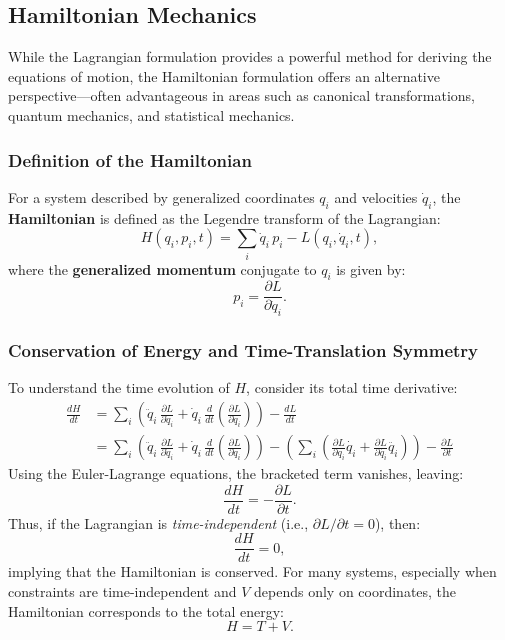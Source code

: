 \subsection{Hamiltonian Mechanics}

While the Lagrangian formulation provides a powerful method for deriving the equations of motion, the Hamiltonian formulation offers an alternative perspective—often advantageous in areas such as canonical transformations, quantum mechanics, and statistical mechanics.

\subsubsection{Definition of the Hamiltonian}

For a system described by generalized coordinates $q_i$ and velocities $\dot{q}_i$, the \textbf{Hamiltonian} is defined as the Legendre transform of the Lagrangian:
\begin{equation}
    H(q_i, p_i, t) = \sum_i \dot{q}_i\, p_i - L(q_i, \dot{q}_i, t),
\end{equation}
where the \textbf{generalized momentum} conjugate to $q_i$ is given by:
\begin{equation}
    p_i = \frac{\partial L}{\partial \dot{q}_i}.
\end{equation}

\subsubsection{Conservation of Energy and Time-Translation Symmetry}

To understand the time evolution of $H$, consider its total time derivative:
\begin{align}
    \frac{dH}{dt} & = \sum_i\left(\ddot{q}_i\,\frac{\partial L}{\partial \dot{q}_i} + \dot{q}_i\,\frac{d}{dt}\left(\frac{\partial L}{\partial \dot{q}_i}\right)\right) - \frac{dL}{dt} \nonumber \\[1mm]
                  & = \sum_i\left(\ddot{q}_i\,\frac{\partial L}{\partial \dot{q}_i} + \dot{q}_i\,\frac{d}{dt}\left(\frac{\partial L}{\partial \dot{q}_i}\right)\right) - \left(\sum_i\left(\frac{\partial L}{\partial q_i} \dot{q_i} + \frac{\partial L}{\partial \dot{q_i}} \ddot{q_i}\right)\right) - \frac{\partial L}{\partial t}
\end{align}
Using the Euler-Lagrange equations, the bracketed term vanishes, leaving:
\begin{equation}
    \frac{dH}{dt} = -\frac{\partial L}{\partial t}.
\end{equation}
Thus, if the Lagrangian is \emph{time-independent} (i.e., $\partial L/\partial t = 0$), then:
\begin{equation}
    \frac{dH}{dt} = 0,
\end{equation}
implying that the Hamiltonian is conserved. For many systems, especially when constraints are time-independent and $V$ depends only on coordinates, the Hamiltonian corresponds to the total energy:
\begin{equation}
    H = T + V.
\end{equation}

